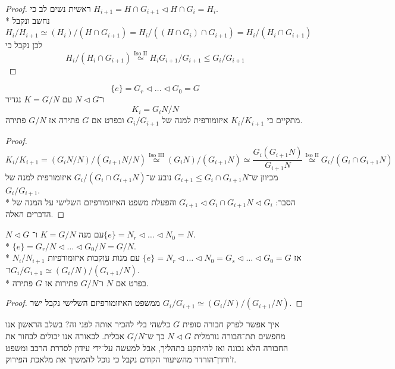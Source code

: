 \begin{proof}
	ראשית נשים לב כי $H_{i + 1} = H \cap G_{i + 1} \triangleleft H \cap G_i = H_i$. \\*
	נחשב ונקבל
	\[
		H_i / H_{i + 1} \simeq (H_i) / (H \cap G_{i + 1})
		= H_i / ((H \cap G_i) \cap G_{i + 1})
		= H_i / (H_i \cap G_{i + 1})
	\]
	לכן נקבל כי
	\[
		H_i / (H_i \cap G_{i + 1}) \overset{\text{Iso II}}{\simeq} H_i G_{i + 1} / G_{i + 1} \le G_i / G_{i + 1}
	\]
\end{proof}
\begin{lemma}
	\[
		\{e\} = G_r \triangleleft \dots \triangleleft G_0 = G
	\]
	ו־$N \triangleleft G$ עם $K = G/N$ נגדיר
	\[
		K_i = G_i N / N
	\]
	מתקיים כי $K_i / K_{i + 1}$ איזומורפית למנה של $G_i / G_{i + 1}$ ובפרט אם $G$ פתירה אז $G/N$ פתירה.
\end{lemma}
\begin{proof}
	\[
		K_i / K_{i + 1}
		= (G_i N / N) / (G_{i + 1}N / N)
		\overset{\text{Iso III}}{\simeq} 
		(G_i N) / (G_{i + 1} N)
		\simeq
		\frac{G_i (G_{i + 1} N)}{G_{i + 1} N}
		\overset{\text{Iso II}}{\simeq} 
		G_i / (G_i \cap G_{i + 1} N)
	\]
	מכיוון ש־$G_{i + 1} \le G_i \cap G_{i + 1} N$ נובע ש־$G_i / (G_i \cap G_{i + 1} N)$ איזומורפית למנה של $G_i / G_{i + 1}$. \\*
	הסבר: $G_{i + 1} \triangleleft G_i \cap G_{i + 1} N \triangleleft G_i$ והפעלת משפט האיזומורפיזם השלישי על המנה של הדברים האלה.
\end{proof}
\begin{lemma}
	$N \triangleleft G$ עם מנה $K = G / N$ ו־$\{e\} = N_r \triangleleft \dots \triangleleft N_0 = N$. \\*
	$\{e\} = G_r / N \triangleleft \dots \triangleleft G_0 / N = G/N$. \\*
	אז $\{e\} = N_r \triangleleft \dots \triangleleft N_0 = G_s \triangleleft \dots \triangleleft G_0 = G$
	עם מנות עוקבות איזומורפיות $N_i / N_{i + 1}$ ו־$G_i / G_{i + 1} \simeq (G_i / N)/(G_{i + 1} / N)$. \\*
	בפרט אם $N$ ו־$G / N$ פתירות אז $G$ פתירה.
\end{lemma}
\begin{proof}
	ממשפט האיזומורפיזם השלישי נקבל ישר $G_i / G_{i + 1} \simeq (G_i / N) / (G_{i + 1} / N)$.
\end{proof}
איך אפשר לפרק חבורה סופית $G$ כלשהי בלי להכיר אותה לפני זה?
בשלב הראשון אנו מחפשים תת־חבורה נורמלית $N \triangleleft G$ כך ש־$G/N$ אבלית.
לכאורה אנו יכולים לבחור את החבורה הלא נכונה ואז להיתקע בתהליך, אבל למעשה על־ידי עידון לסדרת הרכב ומשפט ז'ורדן־הורדר מהשיעור הקודם נקבל כי נוכל להמשיך את מלאכת הפירוק.
